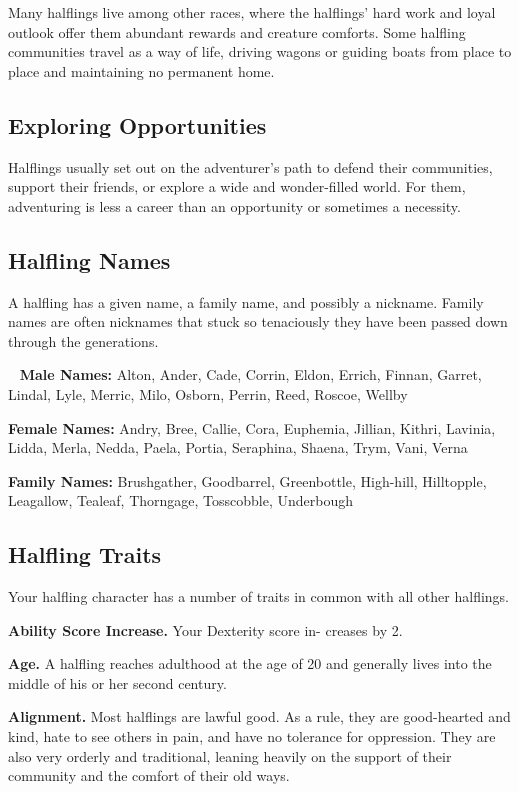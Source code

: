 Many halflings live among other races, where the halflings’ hard work and loyal outlook offer them abundant rewards and creature comforts. Some halfling communities travel as a way of life, driving wagons or guiding boats from place to place and maintaining no permanent home.

\subsection{Exploring Opportunities}
Halflings usually set out on the adventurer’s path to defend their communities, support their friends, or explore a wide and wonder-filled world. For them, adventuring is less a career than an opportunity or sometimes a necessity.

\subsection{Halfling Names}
A halfling has a given name, a family name, and possibly a nickname. Family names are often nicknames that stuck so tenaciously they have been passed down through the generations.

\ \newline
\noindent \textbf{Male Names:} \hangindent=0.3cm Alton, Ander, Cade, Corrin, Eldon, Errich, Finnan, Garret, Lindal, Lyle, Merric, Milo, Osborn, Perrin, Reed, Roscoe, Wellby

\noindent \textbf{Female Names:} \hangindent=0.3cm Andry, Bree, Callie, Cora, Euphemia, Jillian, Kithri, Lavinia, Lidda, Merla, Nedda, Paela, Portia, Seraphina, Shaena, Trym, Vani, Verna

\noindent \textbf{Family Names:} \hangindent=0.3cm Brushgather, Goodbarrel, Greenbottle, High-hill, Hilltopple, Leagallow, Tealeaf, Thorngage, Tosscobble, Underbough

\subsection{Halfling Traits}
Your halfling character has a number of traits in common with all other halflings.

\textbf{Ability Score Increase.} Your Dexterity score in- creases by 2.

\textbf{Age.} A halfling reaches adulthood at the age of 20 and generally lives into the middle of his or her second century.

\textbf{Alignment.} Most halflings are lawful good. As a rule, they are good-hearted and kind, hate to see others in pain, and have no tolerance for oppression. They are also very orderly and traditional, leaning heavily on the support of their community and the comfort of their old ways.

